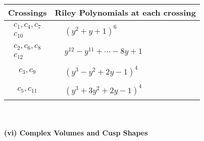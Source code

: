 \documentclass[1p]{elsarticle_modified}
\theoremstyle{definition}
\begin{document}
\begin{tabular}{m{50pt}|m{274pt}}
Crossings & \hspace{64pt}Riley Polynomials at each crossing \\
\hline $$\begin{aligned}c_{1},c_{4},c_{7}\\c_{10}\end{aligned}$$&$\begin{aligned}
&(y^2+y+1)^6
\end{aligned}$\\
\hline $$\begin{aligned}c_{2},c_{6},c_{8}\\c_{12}\end{aligned}$$&$\begin{aligned}
&y^{12}- y^{11}+\cdots-8 y+1
\end{aligned}$\\
\hline $$\begin{aligned}c_{3},c_{9}\end{aligned}$$&$\begin{aligned}
&(y^3- y^2+2 y-1)^4
\end{aligned}$\\
\hline $$\begin{aligned}c_{5},c_{11}\end{aligned}$$&$\begin{aligned}
&(y^3+3 y^2+2 y-1)^4
\end{aligned}$\\
\hline
\end{tabular}\\~\\
\newpage\flushleft \textbf{(vi) Complex Volumes and Cusp Shapes}
\end{document}

